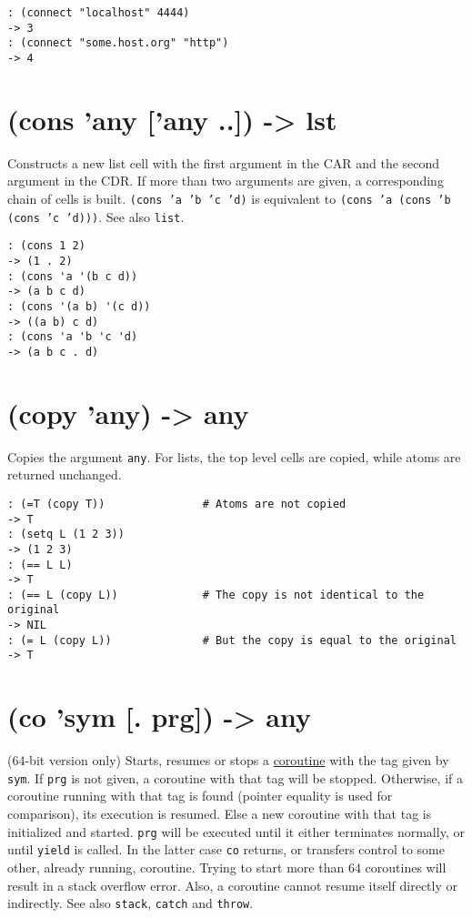 {\begin{verbatim}
: (connect "localhost" 4444)
-> 3
: (connect "some.host.org" "http")
-> 4
\end{verbatim}

 
\section{(cons 'any ['any ..]) -> lst}
\label{sec-8-1-3-33}


Constructs a new list cell with the first argument in the CAR and the
second argument in the CDR. If more than two arguments are given, a
corresponding chain of cells is built. \texttt{(cons 'a 'b 'c 'd)} is
equivalent to \texttt{(cons 'a (cons 'b (cons 'c 'd)))}. See also \texttt{list}.


\begin{verbatim}
: (cons 1 2)
-> (1 . 2)
: (cons 'a '(b c d))
-> (a b c d)
: (cons '(a b) '(c d))
-> ((a b) c d)
: (cons 'a 'b 'c 'd)
-> (a b c . d)
\end{verbatim}

 
\section{(copy 'any) -> any}
\label{sec-8-1-3-34}


Copies the argument \texttt{any}. For lists, the top level cells are copied,
while atoms are returned unchanged.


\begin{verbatim}
: (=T (copy T))               # Atoms are not copied
-> T
: (setq L (1 2 3))
-> (1 2 3)
: (== L L)
-> T
: (== L (copy L))             # The copy is not identical to the original
-> NIL
: (= L (copy L))              # But the copy is equal to the original
-> T
\end{verbatim}

 
\section{(co 'sym [. prg]) -> any}
\label{sec-8-1-3-35}


(64-bit version only) Starts, resumes or stops a
\hyperref[ref.html-coroutines]{coroutine} with the tag given by \texttt{sym}. If \texttt{prg}
is not given, a coroutine with that tag will be stopped. Otherwise, if a
coroutine running with that tag is found (pointer equality is used for
comparison), its execution is resumed. Else a new coroutine with that
tag is initialized and started. \texttt{prg} will be executed until it either
terminates normally, or until \texttt{yield} is called. In the latter case \texttt{co}
returns, or transfers control to some other, already running, coroutine.
Trying to start more than 64 coroutines will result in a stack overflow
error. Also, a coroutine cannot resume itself directly or indirectly.
See also \texttt{stack}, \texttt{catch} and \texttt{throw}.


}
